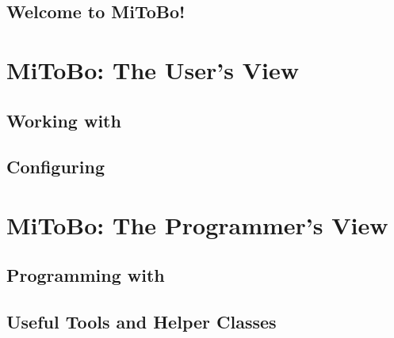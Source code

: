 \chapter{Welcome to MiToBo!}
\label{chap:welcome}


\part{MiToBo: The User's View}
\chapter{Working with \mitobo}
\label{chap:work}

\chapter{Configuring \mitobo}
\label{chap:config}


\part{MiToBo: The Programmer's View}
\chapter{Programming with \mitobo}
\label{chap:program}

\chapter{Useful Tools and Helper Classes}



